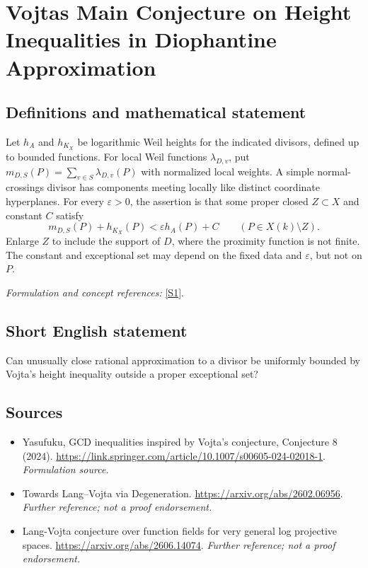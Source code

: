 \documentclass[11pt]{article}
\begin{document}
\section*{\texorpdfstring{Vojtas Main Conjecture on Height Inequalities in Diophantine Approximation}{Vojtas Main Conjecture on Height Inequalities in Diophantine Approximation}}\label{64}
\subsection{Definitions and mathematical statement}
Let $h_A$ and $h_{K_X}$ be logarithmic Weil heights for the indicated divisors, defined up to bounded functions. For local Weil functions $\lambda_{D,v}$, put $m_{D,S}(P)=\sum_{v\in S}\lambda_{D,v}(P)$ with normalized local weights. A simple normal-crossings divisor has components meeting locally like distinct coordinate hyperplanes. For every $\varepsilon>0$, the assertion is that some proper closed $Z\subset X$ and constant $C$ satisfy
\[
 m_{D,S}(P)+h_{K_X}(P)<\varepsilon h_A(P)+C
 \qquad(P\in X(k)\setminus Z).
\]
Enlarge $Z$ to include the support of $D$, where the proximity function is not finite. The constant and exceptional set may depend on the fixed data and $\varepsilon$, but not on $P$.
\par\smallskip\textit{Formulation and concept references:} \href{https://link.springer.com/article/10.1007/s00605-024-02018-1}{[S1]}.

\subsection{Short English statement}
Can unusually close rational approximation to a divisor be uniformly bounded by Vojta's height inequality outside a proper exceptional set?
\subsection{Sources}
\begin{itemize}
\item[S1]Yasufuku, GCD inequalities inspired by Vojta's conjecture, Conjecture 8 (2024).
\url{https://link.springer.com/article/10.1007/s00605-024-02018-1}.
\textit{Formulation source.}
\item[S2]Towards Lang--Vojta via Degeneration.
\url{https://arxiv.org/abs/2602.06956}.
\textit{Further reference; not a proof endorsement.}
\item[S3]Lang-Vojta conjecture over function fields for very general log projective spaces.
\url{https://arxiv.org/abs/2606.14074}.
\textit{Further reference; not a proof endorsement.}
\end{itemize}
\end{document}
